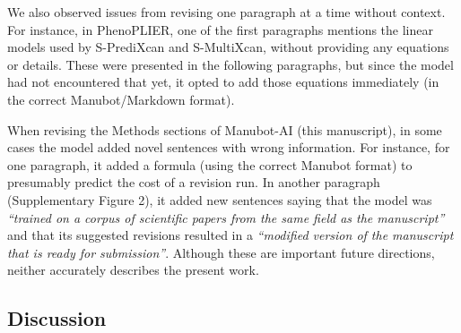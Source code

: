 \documentclass[
]{article}
\begin{document}
We also observed issues from revising one paragraph at a time without context.
For instance, in PhenoPLIER, one of the first paragraphs mentions the linear models used by S-PrediXcan and S-MultiXcan, without providing any equations or details.
These were presented in the following paragraphs, but since the model had not encountered that yet, it opted to add those equations immediately (in the correct Manubot/Markdown format).

% 

When revising the Methods sections of Manubot-AI (this manuscript), in some cases the model added novel sentences with wrong information.
For instance, for one paragraph, it added a formula (using the correct Manubot format) to presumably predict the cost of a revision run.
In another paragraph (Supplementary Figure 2), it added new sentences saying that the model was \emph{``trained on a corpus of scientific papers from the same field as the manuscript''} and that its suggested revisions resulted in a \emph{``modified version of the manuscript that is ready for submission''}.
Although these are important future directions, neither accurately describes the present work.

\hypertarget{discussion}{%
\subsection{Discussion}\label{discussion}}
\end{document}
